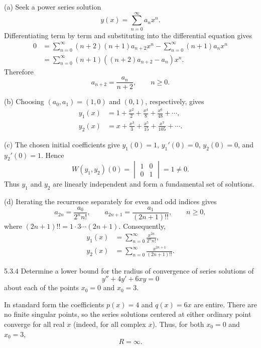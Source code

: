 \documentclass[11pt,oneside]{article}
\begin{document}
\begin{solution}
\noindent\textup{(a)} Seek a power series solution
\[
    y(x)=\sum_{n=0}^{\infty}a_nx^n.
\]
Differentiating term by term and substituting into the differential equation gives
\[
    \begin{aligned}
    0&=\sum_{n=0}^{\infty}(n+2)(n+1)a_{n+2}x^n
       -\sum_{n=0}^{\infty}(n+1)a_nx^n\\
     &=\sum_{n=0}^{\infty}(n+1)((n+2)a_{n+2}-a_n)x^n.
    \end{aligned}
\]
Therefore
\[
    \boxed{a_{n+2}=\frac{a_n}{n+2}}, \qquad n\geq0.
\]

\noindent\textup{(b)} Choosing $(a_0, a_1)=(1, 0)$ and $(0, 1)$, respectively, gives
\[
    \boxed{\begin{aligned}
      y_1(x)&=1+\frac{x^2}{2}+\frac{x^4}{8}+\frac{x^6}{48}+\cdots,\\
      y_2(x)&=x+\frac{x^3}{3}+\frac{x^5}{15}+\frac{x^7}{105}+\cdots.
    \end{aligned}}
\]

\noindent\textup{(c)} The chosen initial coefficients give $y_1(0)=1$, $y_1'(0)=0$, $y_2(0)=0$, and $y_2'(0)=1$. Hence
\[
    \boxed{W(y_1, y_2)(0)=
    \begin{vmatrix}1&0\\0&1\end{vmatrix}=1\ne0}.
\]
Thus $y_1$ and $y_2$ are linearly independent and form a fundamental set of solutions.

\noindent\textup{(d)} Iterating the recurrence separately for even and odd indices gives
\[
    a_{2n}=\frac{a_0}{2^n n!}, \qquad
    a_{2n+1}=\frac{a_1}{(2n+1)!!}, \qquad n\geq0,
\]
where $(2n+1)!!=1\cdot3\cdots(2n+1)$. Consequently,
\[
    \boxed{\begin{aligned}
      y_1(x)&=\sum_{n=0}^{\infty}\frac{x^{2n}}{2^n n!},\\
      y_2(x)&=\sum_{n=0}^{\infty}\frac{x^{2n+1}}{(2n+1)!!}.
    \end{aligned}}
\]
\end{solution}

\begin{problem}{5.3.4}
Determine a lower bound for the radius of convergence of series solutions of
\[
    y''+4y'+6xy=0
\]
about each of the points $x_0=0$ and $x_0=3$.
\end{problem}

\begin{solution}
In standard form the coefficients $p(x)=4$ and $q(x)=6x$ are entire. There are no finite singular points, so the series solutions centered at either ordinary point converge for all real $x$ (indeed, for all complex $x$). Thus, for both $x_0=0$ and $x_0=3$,
\[
    \boxed{R=\infty}.
\]
\end{solution}
\end{document}

